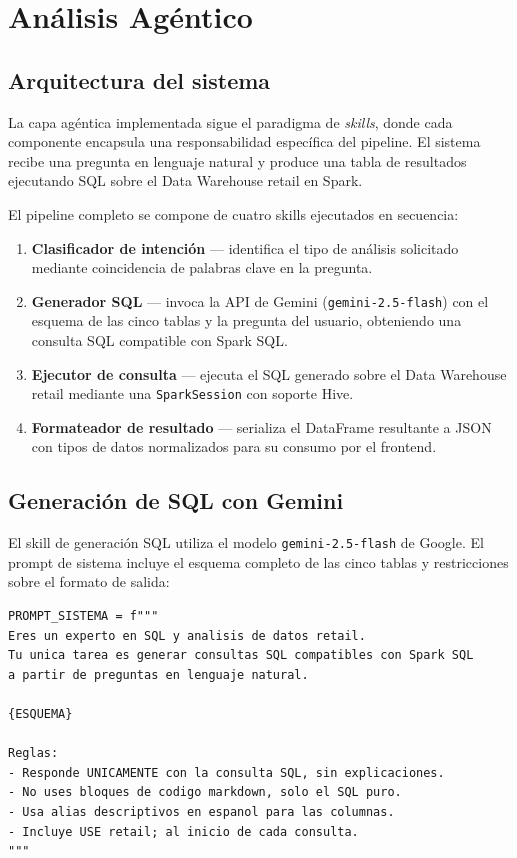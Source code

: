 
\section{Análisis Agéntico}

\subsection{Arquitectura del sistema}

La capa agéntica implementada sigue el paradigma de \textit{skills}, donde cada componente
encapsula una responsabilidad específica del pipeline. El sistema recibe una pregunta en
lenguaje natural y produce una tabla de resultados ejecutando SQL sobre el Data Warehouse
retail en Spark.

El pipeline completo se compone de cuatro skills ejecutados en secuencia:

\begin{enumerate}[noitemsep]
    \item \textbf{Clasificador de intención} — identifica el tipo de análisis solicitado
          mediante coincidencia de palabras clave en la pregunta.
    \item \textbf{Generador SQL} — invoca la API de Gemini (\texttt{gemini-2.5-flash}) con
          el esquema de las cinco tablas y la pregunta del usuario, obteniendo una consulta
          SQL compatible con Spark SQL.
    \item \textbf{Ejecutor de consulta} — ejecuta el SQL generado sobre el Data Warehouse
          retail mediante una \texttt{SparkSession} con soporte Hive.
    \item \textbf{Formateador de resultado} — serializa el DataFrame resultante a JSON
          con tipos de datos normalizados para su consumo por el frontend.
\end{enumerate}

\subsection{Generación de SQL con Gemini}

El skill de generación SQL utiliza el modelo \texttt{gemini-2.5-flash} de Google.
El prompt de sistema incluye el esquema completo de las cinco tablas y restricciones
sobre el formato de salida:

\begin{lstlisting}[style=python, caption={Configuración del prompt para generación de SQL}]
PROMPT_SISTEMA = f"""
Eres un experto en SQL y analisis de datos retail.
Tu unica tarea es generar consultas SQL compatibles con Spark SQL
a partir de preguntas en lenguaje natural.

{ESQUEMA}

Reglas:
- Responde UNICAMENTE con la consulta SQL, sin explicaciones.
- No uses bloques de codigo markdown, solo el SQL puro.
- Usa alias descriptivos en espanol para las columnas.
- Incluye USE retail; al inicio de cada consulta.
"""
\end{lstlisting}

